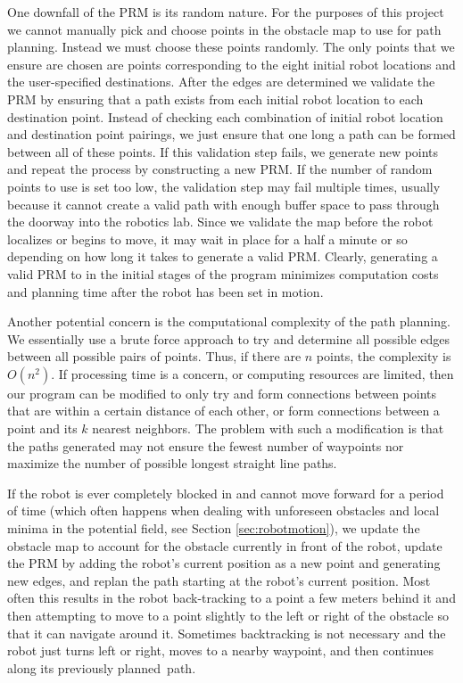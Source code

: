 \documentclass[11pt]{article}
\begin{document}
One downfall of the PRM is its random nature. For the purposes of this project we cannot manually pick and choose points in the obstacle map to use for path planning. Instead we must choose these points randomly. The only points that we ensure are chosen are points corresponding to the eight initial robot locations and the user-specified destinations. After the edges are determined we validate the PRM by ensuring that a path exists from each initial robot location to each destination point. Instead of checking each combination of initial robot location and destination point pairings, we just ensure that one long a path can be formed between all of these points. If this validation step fails, we generate new points and repeat the process by constructing a new PRM. If the number of random points to use is set too low, the validation step may fail multiple times, usually because it cannot create a valid path with enough buffer space to pass through the doorway into the robotics lab. Since we validate the map before the robot localizes or begins to move, it may wait in place for a half a minute or so depending on how long it takes to generate a valid PRM. Clearly, generating a valid PRM to in the initial stages of the program minimizes computation costs and planning time after the robot has been set in motion.

Another potential concern is the computational complexity of the path planning. We essentially use a brute force approach to try and determine all possible edges between all possible pairs of points. Thus, if there are $n$ points, the complexity is $O(n^2)$. If processing time is a concern, or computing resources are limited, then our program can be modified to only try and form connections between points that are within a certain distance of each other, or form connections between a point and its $k$ nearest neighbors. The problem with such a modification is that the paths generated may not ensure the fewest number of waypoints nor maximize the number of possible longest straight line paths.

If the robot is ever completely blocked in and cannot move forward for a period of time (which often happens when dealing with unforeseen obstacles and local minima in the potential field, see Section \ref{sec:robotmotion}), we update the obstacle map to account for the obstacle currently in front of the robot, update the PRM by adding the robot's current position as a new point and generating new edges, and replan the path starting at the robot's current position. Most often this results in the robot back-tracking to a point a few meters behind it and then attempting to move to a point slightly to the left or right of the obstacle so that it can navigate around it. Sometimes backtracking is not necessary and the robot just turns left or right, moves to a nearby waypoint, and then continues along its previously planned~path.
\end{document}
